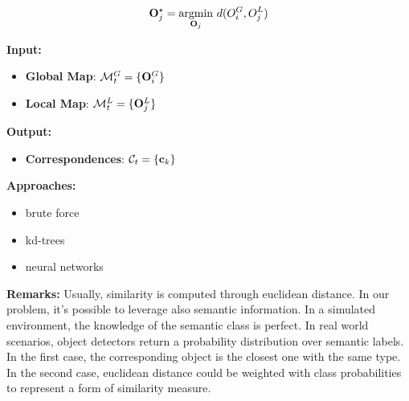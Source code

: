 \documentclass{article}
\begin{document}
	\begin{equation}
		\mathbf{O}_j^\star = \operatorname*{argmin}_{\mathbf{O}_j} \, d(O_i^G,O_j^L)
	\end{equation}
		
	\noindent
	{\bf Input: }
	\begin{itemize}
		\item {\bf Global Map}: $\mathcal{M}^G_t = \{ \mathbf{O}_i^G \}$
		\item {\bf Local Map}: $\mathcal{M}^L_t = \{ \mathbf{O}_j^L \}$
	\end{itemize}
	\noindent
	{\bf Output: }
	\begin{itemize}
		\item {\bf Correspondences}: $\mathcal{C}_t = \{\mathbf{c}_k\}$		
	\end{itemize}
	\noindent
	{\bf Approaches: }
	\begin{itemize}
		\item brute force
		\item kd-trees
		\item neural networks
	\end{itemize}
	\noindent
	{\bf Remarks: }
	Usually, similarity is computed through euclidean distance. In our problem, it's possible to leverage also semantic information. In a simulated environment, the knowledge of the semantic class is perfect. In real world scenarios, object detectors return a probability distribution over semantic labels. In the first case, the corresponding object is the closest one with the same type. In the second case, euclidean distance could be weighted with class probabilities to represent a form of similarity measure.
		
		
	
\end{document}
